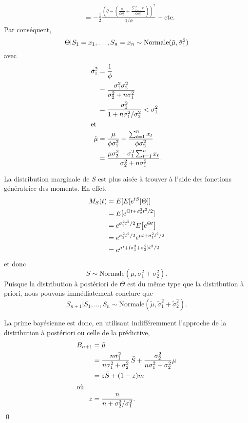 \begin{exemple}
\begin{align*}
    &= - \frac{1}{2}
      \frac{
      \left(
      \theta -
      \left(
      \frac{\mu}{\phi \sigma_1^2} +
      \frac{\sum_{t=1}^n x_t}{\phi \sigma_2^2}
      \right)
      \right)^2}{1/\phi} +
      \text{cte}.
  \end{align*}
  Par conséquent,
  \begin{equation*}
    \Theta|S_1 = x_1, \dots, S_n = x_n
    \sim \text{Normale}(\tilde{\mu}, \tilde{\sigma}_1^2) \\
  \end{equation*}
  avec
  \begin{align*}
    \tilde{\sigma}_1^2
    &= \frac{1}{\phi} \\
    &= \frac{\sigma_1^2 \sigma_2^2}{\sigma_2^2 + n \sigma_1^2} \\
    &= \frac{\sigma_1^2}{1 + n \sigma_1^2/\sigma_2^2} < \sigma_1^2 \\
    \intertext{et}
    \tilde{\mu}
    &= \frac{\mu}{\phi \sigma_1^2} +
      \frac{\sum_{t = 1}^n x_t}{\phi \sigma_2^2} \\
    &= \frac{\mu \sigma_2^2 + \sigma_1^2 \sum_{t = 1}^n x_t}{%
      \sigma_2^2 + n \sigma_1^2}.
  \end{align*}

  La distribution marginale de $S$ est plus aisée à trouver à l'aide
  des fonctions génératrice des moments. En effet,
  \begin{align*}
    M_S(t)
    &= E [ E [ e^{tS}|\Theta ] ] \\
    &= E [ e^{\Theta t + \sigma_2^2 t^2/2} ] \\
    &= e^{\sigma_2^2 t^2/2} E\! \left[ e^{\Theta t} \right] \\
    &= e^{\sigma_2^2 t^2/2} e^{\mu t + \sigma_1^2 t^2/2} \\
    &= e^{\mu t + (\sigma_1^2 + \sigma_2^2) t^2/2}
  \end{align*}
  et donc
  \begin{equation*}
    S \sim \text{Normale}(\mu, \sigma_1^2 + \sigma_2^2).
  \end{equation*}
  Puisque la distribution à postériori de $\Theta$ est du même type
  que la distribution à priori, nous pouvons immédiatement conclure
  que
  \begin{equation*}
    S_{n+1}|S_1, \dots, S_n \sim
    \text{Normale}(\tilde{\mu}, \tilde{\sigma}_1^2 + \tilde{\sigma}_2^2).
  \end{equation*}

  La prime bayésienne est donc, en utilisant indifféremment l'approche
  de la distribution à postériori ou celle de la prédictive,
  \begin{align*}
    B_{n+1}
    &= \tilde{\mu} \\
    &= \frac{n \sigma_1^2}{n \sigma_1^2 + \sigma_2^2}\, \bar{S} +
      \frac{\sigma_2^2}{n \sigma_1^2 + \sigma_2^2} \mu \\
    &= z \bar{S} + (1 - z) m \\
    \intertext{où}
    z
    &= \frac{n}{n + \sigma_2^2/\sigma_1^2}.
  \end{align*}
  \qed
\end{exemple}

